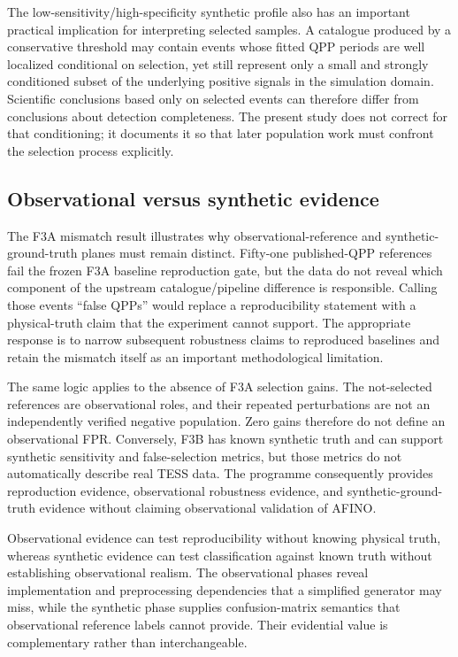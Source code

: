 \documentclass[11pt,a4paper]{article}
\begin{document}
The low-sensitivity/high-specificity synthetic profile also has an important practical implication for interpreting selected samples. A catalogue produced by a conservative threshold may contain events whose fitted QPP periods are well localized conditional on selection, yet still represent only a small and strongly conditioned subset of the underlying positive signals in the simulation domain. Scientific conclusions based only on selected events can therefore differ from conclusions about detection completeness. The present study does not correct for that conditioning; it documents it so that later population work must confront the selection process explicitly.

\subsection{Observational versus synthetic evidence}
The F3A mismatch result illustrates why observational-reference and synthetic-ground-truth planes must remain distinct. Fifty-one published-QPP references fail the frozen F3A baseline reproduction gate, but the data do not reveal which component of the upstream catalogue/pipeline difference is responsible. Calling those events ``false QPPs'' would replace a reproducibility statement with a physical-truth claim that the experiment cannot support. The appropriate response is to narrow subsequent robustness claims to reproduced baselines and retain the mismatch itself as an important methodological limitation.

The same logic applies to the absence of F3A selection gains. The not-selected references are observational roles, and their repeated perturbations are not an independently verified negative population. Zero gains therefore do not define an observational FPR. Conversely, F3B has known synthetic truth and can support synthetic sensitivity and false-selection metrics, but those metrics do not automatically describe real TESS data. The programme consequently provides reproduction evidence, observational robustness evidence, and synthetic-ground-truth evidence without claiming observational validation of AFINO.

Observational evidence can test reproducibility without knowing physical truth, whereas synthetic evidence can test classification against known truth without establishing observational realism. The observational phases reveal implementation and preprocessing dependencies that a simplified generator may miss, while the synthetic phase supplies confusion-matrix semantics that observational reference labels cannot provide. Their evidential value is complementary rather than interchangeable.
\end{document}
